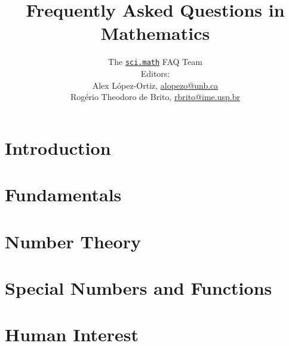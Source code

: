 \documentclass[a4paper]{report}
\title{Frequently Asked Questions in Mathematics}
\author{The \href{news://sci.math}{\texttt{sci.math}} FAQ Team\\
  \bigskip
  {\small Editors:}\\
  \bigskip
  {\small Alex L\'{o}pez-Ortiz, \url{alopezo@unb.ca}}\\
  {\small Rog\'{e}rio Theodoro de Brito, \url{rbrito@ime.usp.br}}
}
\begin{document}
\maketitle
\tableofcontents


\chapter{Introduction}
  
\chapter{Fundamentals}
  
  
  
  
\chapter{Number Theory}
  
  
\chapter{Special Numbers and Functions}
  
  
  
  \begin{cbunit}
    
  \end{cbunit}
  
  
\chapter{Human Interest}
  
  
  
  
  
  
\end{document}
